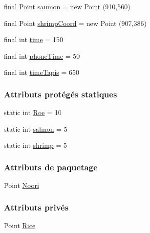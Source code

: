 \begin{DoxyCompactItemize}
\item 
final Point \hyperlink{classTestSushi_1_1src_1_1Suchi_1_1Recette_a855a7ed217eec3565619156fa6cd4214}{saumon} = new Point (910,560)
\item 
final Point \hyperlink{classTestSushi_1_1src_1_1Suchi_1_1Recette_a69faeadec2c0d475bbd77c3b7eeaada7}{shrimp\+Coord} = new Point (907,386)
\item 
final int \hyperlink{classTestSushi_1_1src_1_1Suchi_1_1Recette_a2c78759553661a7e4b01d4ac1212ec6c}{time} = 150
\item 
final int \hyperlink{classTestSushi_1_1src_1_1Suchi_1_1Recette_a0d95a4a68ee0d423b6815b296f3304b2}{phone\+Time} = 50
\item 
final int \hyperlink{classTestSushi_1_1src_1_1Suchi_1_1Recette_a7db8ec6383e36487bc7ca0490edd0b4a}{time\+Tapis} = 650
\end{DoxyCompactItemize}
\subsubsection*{Attributs protégés statiques}
\begin{DoxyCompactItemize}
\item 
static int \hyperlink{classTestSushi_1_1src_1_1Suchi_1_1Recette_ab4ceb10875120aaae2ade481b6088c6d}{Roe} = 10
\item 
static int \hyperlink{classTestSushi_1_1src_1_1Suchi_1_1Recette_a726a712fe936ef2a96982e00d21c49c0}{salmon} = 5
\item 
static int \hyperlink{classTestSushi_1_1src_1_1Suchi_1_1Recette_a07fa939a0df1b7ff45a9d4aa77498e8e}{shrimp} = 5
\end{DoxyCompactItemize}
\subsubsection*{Attributs de paquetage}
\begin{DoxyCompactItemize}
\item 
Point \hyperlink{classTestSushi_1_1src_1_1Suchi_1_1Onigiri_ad9ea5c6d6fbea487dab44c83bdb3cd52}{Noori}
\end{DoxyCompactItemize}
\subsubsection*{Attributs privés}
\begin{DoxyCompactItemize}
\item 
Point \hyperlink{classTestSushi_1_1src_1_1Suchi_1_1Onigiri_af198bcd3c1eb0ba8bfe4cc66ee2b9aad}{Rice}
\end{DoxyCompactItemize}



